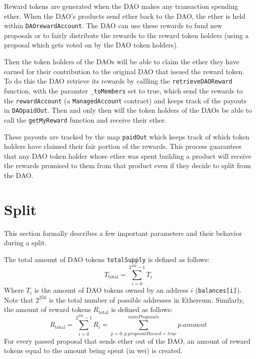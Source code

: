 \documentclass[9pt,oneside]{amsart}
\begin{document}
\begin{multicols}{2}
Reward tokens are generated when the DAO makes any transaction spending ether. When the DAO’s products send ether back to the DAO, the ether is held within \verb|DAOrewardAccount|. The DAO can use these rewards to fund new proposals or to fairly distribute the rewards to the reward token holders (using a proposal which gets voted on by the DAO token holders).

Then the token holders of the DAOs will be able to claim the ether they have earned for their contribution to the original DAO that issued the reward token. To do this the DAO retrieve its rewards by callling the \verb|retrieveDAOReward| function, with the paramter \verb|_toMembers| set to true, which send the rewards to the \verb|rewardAccount| (a \verb|ManagedAccount| contract) and keeps track of the payouts in \verb|DAOpaidOut|.
Then and only then will the token holders of the DAOs be able to call the \verb|getMyReward| function and receive their ether.

These payouts are tracked by the map \verb|paidOut| which keeps track of which token holders have claimed their fair portion of the rewards. This process guarantees that any DAO token holder whose ether was spent building a product will receive the rewards promised to them from that product even if they decide to split from the DAO. 

\section{Split} \label{split}

This section formally describes a few important parameters and their behavior during a split.

The total amount of DAO tokens \verb|totalSupply| is defined as follows:
\begin{equation}
T_{\text{total}} = \sum_{i=0}^{2^{256}-1} T_i
\end{equation}
Where $T_i$ is the amount of DAO tokens owned by an address $i$ (\verb|balances[i]|). Note that  $2^{256}$ is the total number of possible addresses in Ethereum.
Similarly, the amount of reward tokens $R_{\text{total}}$ is defined as follows:
\begin{equation}
 R_{\text{total}} = \sum_{i=0}^{2^{256}-1} R_i = \sum_{p=0; p.proposalPassed = true}^{numProposals} p.amount
\end{equation}
For every passed proposal that sends ether out of the DAO, an amount of reward tokens equal to the amount being spent (in wei) is created.



\end{multicols}
\end{document}
